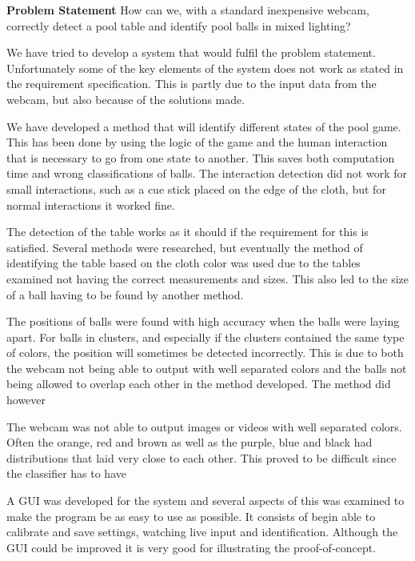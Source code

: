 \textbf{Problem Statement}
How can we, with a standard inexpensive webcam, correctly detect a pool table and identify pool balls in mixed lighting?

We have tried to develop a system that would fulfil the problem statement. Unfortunately some of the key elements of the system does not work as stated in the requirement specification. This is partly due to the input data from the webcam, but also because of the solutions made.

We have developed a method that will identify different states of the pool game. This has been done by using the logic of the game and the human interaction that is necessary to go from one state to another. This saves both computation time and wrong classifications of balls. The interaction detection did not work for small interactions, such as a cue stick placed on the edge of the cloth, but for normal interactions it worked fine.

The detection of the table works as it should if the requirement for this is satisfied. Several methods were researched, but eventually the method of identifying the table based on the cloth color was used due to the tables examined not having the correct measurements and sizes. This also led to the size of a ball having to be found by another method.

The positions of balls were found with high accuracy when the balls were laying apart. For balls in clusters, and especially if the clusters contained the same type of colors, the position will sometimes be detected incorrectly. This is due to both the webcam not being able to output with well separated colors and the balls not being allowed to overlap each other in the method developed. The method did however 



The webcam was not able to output images or videos with well separated colors. Often the orange, red and brown as well as the purple, blue and black had distributions that laid very close to each other. This proved to be difficult since the classifier has to have 

A GUI was developed for the system and several aspects of this was examined to make the program be as easy to use as possible. It consists of begin able to calibrate and save settings, watching live input and identification. Although the GUI could be improved it is very good for illustrating the proof-of-concept.

